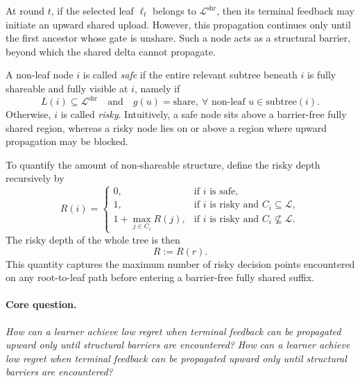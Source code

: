 At round $t$, if the selected leaf $\ell_t$ belongs to $\mathcal{L}^{\mathrm{shr}}$, then its terminal feedback may initiate an upward shared upload. However, this propagation continues only until the first ancestor whose gate is $\mathrm{unshare}$. Such a node acts as a structural barrier, beyond which the shared delta cannot propagate.

A non-leaf node $i$ is called \emph{safe} if the entire relevant subtree beneath $i$ is fully shareable and fully visible at $i$, namely if
\[
L(i) \subseteq \mathcal{L}^{\mathrm{shr}}
\quad \text{and} \quad
g(u)=\mathrm{share}, \ \forall \text{ non-leaf } u \in \mathrm{subtree}(i).
\]
Otherwise, $i$ is called \emph{risky}. Intuitively, a safe node sits above a barrier-free fully shared region, whereas a risky node lies on or above a region where upward propagation may be blocked.

To quantify the amount of non-shareable structure, define the risky depth recursively by
\[
R(i)=
\begin{cases}
0, & \text{if } i \text{ is safe},\\
1, & \text{if } i \text{ is risky and } C_i \subseteq \mathcal{L},\\
1+\max_{j \in C_i} R(j), & \text{if } i \text{ is risky and } C_i \not\subseteq \mathcal{L}.
\end{cases}
\]
The risky depth of the whole tree is then
\[
R := R(r).
\]
This quantity captures the maximum number of risky decision points encountered on any root-to-leaf path before entering a barrier-free fully shared suffix.

\paragraph{Core question.}
\emph{How can a learner achieve low regret when terminal feedback can be propagated upward only until structural barriers are encountered?}
\emph{How can a learner achieve low regret when terminal feedback can be propagated upward only until structural barriers are encountered?}